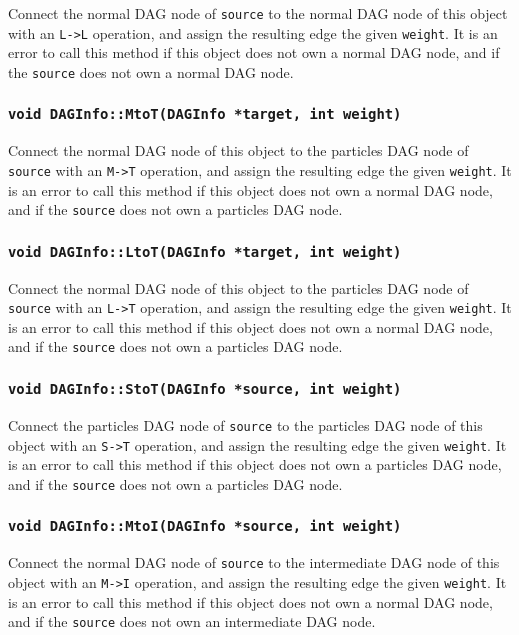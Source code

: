 Connect the normal DAG node of \texttt{source} to the normal DAG node of
this object with an \texttt{L->L} operation, and assign the resulting edge the
given \texttt{weight}. It is an error to call this method if this object does
not own a normal DAG node, and if the \texttt{source} does not own a normal
DAG node.

\subsubsection{\texttt{void DAGInfo::MtoT(DAGInfo *target, int weight)}}

Connect the normal DAG node of this object to the particles DAG node of
\texttt{source} with an \texttt{M->T} operation, and assign the resulting edge
the given \texttt{weight}. It is an error to call this method if this object
does not own a normal DAG node, and if the \texttt{source} does not own a
particles DAG node.

\subsubsection{\texttt{void DAGInfo::LtoT(DAGInfo *target, int weight)}}

Connect the normal DAG node of this object to the particles DAG node of
\texttt{source} with an \texttt{L->T} operation, and assign the resulting edge
the given \texttt{weight}. It is an error to call this method if this object
does not own a normal DAG node, and if the \texttt{source} does not own a
particles DAG node.

\subsubsection{\texttt{void DAGInfo::StoT(DAGInfo *source, int weight)}}

Connect the particles DAG node of \texttt{source} to the particles DAG node of
this object with an \texttt{S->T} operation, and assign the resulting edge the
given \texttt{weight}. It is an error to call this method if this object does
not own a particles DAG node, and if the \texttt{source} does not own a
particles DAG node.

\subsubsection{\texttt{void DAGInfo::MtoI(DAGInfo *source, int weight)}}

Connect the normal DAG node of \texttt{source} to the intermediate DAG node of
this object with an \texttt{M->I} operation, and assign the resulting edge the
given \texttt{weight}. It is an error to call this method if this object does
not own a normal DAG node, and if the \texttt{source} does not own an
intermediate DAG node.

